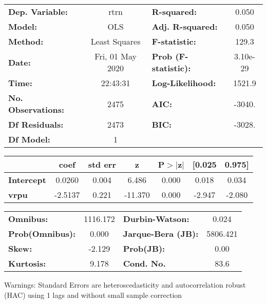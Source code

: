 \begin{center}
\begin{tabular}{lclc}
\toprule
\textbf{Dep. Variable:}    &       rtrn       & \textbf{  R-squared:         } &     0.050   \\
\textbf{Model:}            &       OLS        & \textbf{  Adj. R-squared:    } &     0.050   \\
\textbf{Method:}           &  Least Squares   & \textbf{  F-statistic:       } &     129.3   \\
\textbf{Date:}             & Fri, 01 May 2020 & \textbf{  Prob (F-statistic):} &  3.10e-29   \\
\textbf{Time:}             &     22:43:31     & \textbf{  Log-Likelihood:    } &    1521.9   \\
\textbf{No. Observations:} &        2475      & \textbf{  AIC:               } &    -3040.   \\
\textbf{Df Residuals:}     &        2473      & \textbf{  BIC:               } &    -3028.   \\
\textbf{Df Model:}         &           1      & \textbf{                     } &             \\
\bottomrule
\end{tabular}
\begin{tabular}{lcccccc}
                   & \textbf{coef} & \textbf{std err} & \textbf{z} & \textbf{P$> |$z$|$} & \textbf{[0.025} & \textbf{0.975]}  \\
\midrule
\textbf{Intercept} &       0.0260  &        0.004     &     6.486  &         0.000        &        0.018    &        0.034     \\
\textbf{vrpu}      &      -2.5137  &        0.221     &   -11.370  &         0.000        &       -2.947    &       -2.080     \\
\bottomrule
\end{tabular}
\begin{tabular}{lclc}
\textbf{Omnibus:}       & 1116.172 & \textbf{  Durbin-Watson:     } &    0.024  \\
\textbf{Prob(Omnibus):} &   0.000  & \textbf{  Jarque-Bera (JB):  } & 5806.421  \\
\textbf{Skew:}          &  -2.129  & \textbf{  Prob(JB):          } &     0.00  \\
\textbf{Kurtosis:}      &   9.178  & \textbf{  Cond. No.          } &     83.6  \\
\bottomrule
\end{tabular}
\end{center}

Warnings: \newline
 [1] Standard Errors are heteroscedasticity and autocorrelation robust (HAC) using 1 lags and without small sample correction